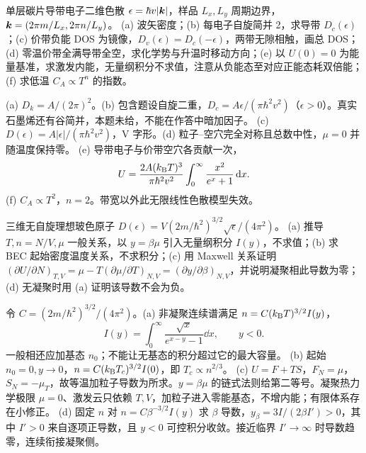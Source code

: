\begin{center}\end{center}
\begin{exercise}
单层碳片导带电子二维色散 $\epsilon=\hbar v|\boldsymbol{k}|$，样品 $L_x,L_y$ 周期边界，$\boldsymbol{k}=(2\pi m/L_x,2\pi n/L_y)$。
(a) 波矢密度；(b) 每电子自旋简并 2，求导带 $D_c(\epsilon)$；(c) 价带负能 DOS 为镜像，$D_v(\epsilon)=D_c(-\epsilon)$，两带无隙相触，画总 DOS；(d) 零温价带全满导带全空，求化学势与升温时移动方向；(e) 以 $U(0)=0$ 为能量基准，求激发内能，无量纲积分不求值，注意从负能态至对应正能态耗双倍能；(f) 求低温 $C_A\propto T^n$ 的指数。
\end{exercise}
\begin{solution}
(a) $D_k=A/(2\pi)^2$。(b) 包含题设自旋二重，$D_c=A\epsilon/(\pi\hbar^2v^2)$（$\epsilon>0$）。真实石墨烯还有谷简并，本题未给，不能在作答中暗加因子。
(c) $D(\epsilon)=A|\epsilon|/(\pi\hbar^2v^2)$，V 字形。(d) 粒子--空穴完全对称且总数中性，$\mu=0$ 并随温度保持零。
(e) 导带电子与价带空穴各贡献一次，
\[U=\frac{2A(k_{\mathrm B} T)^3}{\pi\hbar^2v^2}\int_0^\infty\frac{x^2}{e^x+1}\,\mathrm d x.\]
(f) $C_A\propto T^2$，$n=2$。带宽以外此无限线性色散模型失效。
\end{solution}
\begin{center}\end{center}
\begin{exercise}
三维无自旋理想玻色原子 $D(\epsilon)=V(2m/\hbar^2)^{3/2}\sqrt\epsilon/(4\pi^2)$。
(a) 推导 $T,n=N/V,\mu$ 一般关系，以 $y=\beta\mu$ 引入无量纲积分 $I(y)$，不求值；(b) 求 BEC 起始密度温度关系，不求积分；(c) 用 Maxwell 关系证明 $(\partial U/\partial N)_{T,V}=\mu-T(\partial\mu/\partial T)_{N,V}=(\partial y/\partial\beta)_{N,V}$，并说明凝聚相此导数为零；(d) 无凝聚时用 (a) 证明该导数不会为负。
\end{exercise}
\begin{solution}
令 $C=(2m/\hbar^2)^{3/2}/(4\pi^2)$。(a) 非凝聚连续谱满足 $n=C(k_{\mathrm B} T)^{3/2}I(y)$，
\[I(y)=\int_0^\infty\frac{\sqrt x}{e^{x-y}-1}\dd x,\qquad y<0.\]
一般相还应加基态 $n_0$；不能让无基态的积分超过它的最大容量。
(b) 起始 $n_0=0,y\to0$，$n=C(k_{\mathrm B} T_c)^{3/2}I(0)$，即 $T_c\propto n^{2/3}$。
(c) $U=F+TS$，$F_N=\mu$，$S_N=-\mu_T$，故等温加粒子导数为所求。$y=\beta\mu$ 的链式法则给第二等号。凝聚热力学极限 $\mu=0$、激发云只依赖 $T,V$，加粒子进入零能基态，不增内能；有限体系存在小修正。
(d) 固定 $n$ 对 $n=C\beta^{-3/2}I(y)$ 求 $\beta$ 导数，$y_\beta=3I/(2\beta I')>0$，其中 $I'>0$ 来自逐项正导数，且 $y<0$ 可控积分收敛。接近临界 $I'\to\infty$ 时导数趋零，连续衔接凝聚侧。
\end{solution}
